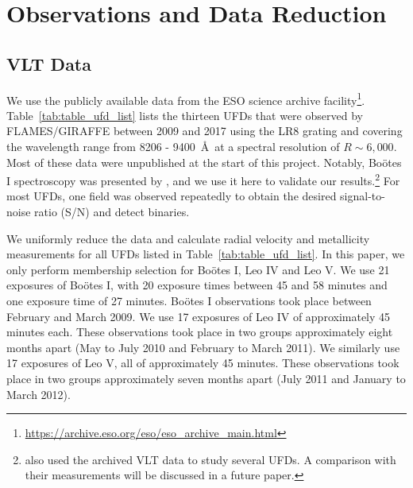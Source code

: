 \documentclass[twocolumn]{aastex63}
\begin{document}
\section{Observations and Data Reduction}
\label{sec:observations}
\subsection{VLT Data}
\label{sec:data}
We use the publicly available data from the ESO science archive facility\footnote{\url{https://archive.eso.org/eso/eso_archive_main.html}}. Table~\ref{tab:table_ufd_list} lists the thirteen UFDs that were observed by FLAMES/GIRAFFE \citep{pas2000} between 2009 and 2017 using the LR8 grating and covering the wavelength range from 8206 - 9400~\AA~at a spectral resolution of $R\sim6,000$. 
Most of these data were unpublished at the start of this project. Notably, Bo{\"o}tes I spectroscopy was presented by \citet{kop2011}, and we use it here to validate our results.\footnote{\citet{fri2019} also used the archived VLT data to study several UFDs. A comparison with their measurements will be discussed in a future paper.} For most UFDs, one field was observed repeatedly to obtain the desired signal-to-noise ratio (S/N) and detect binaries. 

We uniformly reduce the data and calculate radial velocity and metallicity measurements for all UFDs listed in Table~\ref{tab:table_ufd_list}. In this paper, we only perform membership selection for Bo{\"o}tes I, Leo IV and Leo V. We use 21 exposures of Bo{\"o}tes I, with 20 exposure times between 45 and 58 minutes and one exposure time of 27 minutes. Bo{\"o}tes I observations took place between February and March 2009. We use 17 exposures of Leo IV of approximately 45 minutes each. These observations took place in two groups approximately eight months apart (May to July 2010 and February to March 2011). We similarly use 17 exposures of Leo V, all of approximately 45 minutes. These observations took place in two groups approximately seven months apart (July 2011 and January to March 2012). 
\end{document}
